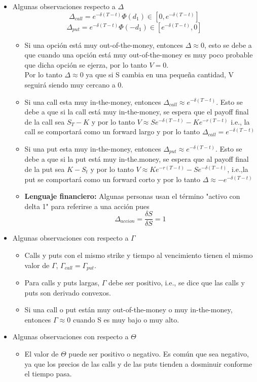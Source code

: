\documentclass[12pts]{extarticle}
\begin{document}
\begin{itemize}
\item Algunas observaciones respecto a $\Delta$ 
$$\Delta_{call}=e^{-\delta(T-t)}\Phi(d_1) \in [0, e^{-\delta(T-t)}]$$
$$\Delta_{put}=e^{-\delta(T-t)}\Phi(-d_1) \in [e^{-\delta(T-t)},0 ]$$
\begin{itemize}
\item Si una opción está muy out-of-the-money, entonces $\Delta \approx 0$, esto se debe a que cuando una opción está muy out-of-the-money es muy poco probable que dicha opción se ejerza, por lo tanto $V=0$. \\ Por lo tanto $\Delta \approx 0$ ya que si S cambia en una pequeña cantidad, V seguirá siendo muy cercano a 0.
\item Si una call esta muy in-the-money, entonces $\Delta_{call} \approx e^{-\delta(T-t)}$. Esto se debe a que si la call está muy in-the-money, se espera que el payoff final de la call sea $S_T-K$ y por lo tanto $V \approx Se^{-\delta(T-t)}-Ke^{-r(T-t)}$ i.e., la call se comportará como un forward largo y por lo tanto $\Delta_{call}=e^{-\delta(T-t)}$ 
\item Si una put esta muy in-the-money, entonces $\Delta_{put} \approx e^{-\delta(T-t)}$. Esto se debe a que si la put está muy in-the.money, se espera que al payoff final de la put sea $K-S_t$ y por lo tanto $V \approx Ke^{-r(T-t)}-Se^{-\delta(T-t)}$, i.e.,la put se comportará como un forward corto y por lo tanto $\Delta \approx -e^{-\delta(T-t)}$ 
\item \textbf{Lenguaje financiero:} Algunas personas usan el término "activo con delta 1" para referirse a una acción pues $$\Delta_{accion}=\frac{\delta S}{\delta S}=1$$
\end{itemize}
\item Algunas observaciones con respecto a $\Gamma$
\begin{itemize}
\item Calls y puts con el mismo strike y tiempo al vencimiento tienen el mismo valor de $\Gamma$, $\Gamma_{call}=\Gamma_{put}$.
\item Para calls y puts largas, $\Gamma$ debe ser positivo, i.e., se dice que las calls y puts son derivado convexos. 
\item Si una call o put están muy out-of-the-money o muy in-the-money, entonces $\Gamma \approx 0$ cuando S es muy bajo o muy alto. 
\end{itemize}
\item Algunas observaciones con respecto a $\Theta$
\begin{itemize}
\item El valor de $\Theta$ puede ser positivo o negativo. Es común que sea negativo, ya que los precios de las calls y de las puts tienden a dosminuir conforme el tiempo pasa. \\

\end{itemize}
\end{itemize}
\end{document}
